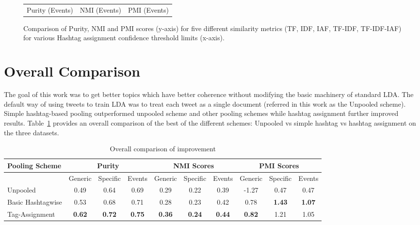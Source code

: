 \documentclass[10pt,a5paper,twoside]{article}
\begin{document}
\begin{figure}[t!]
\begin{center}
{\begin{tabular}{ccc}
		

		{\LARGE Purity (Events)} & {\LARGE NMI (Events)} & 
		{\LARGE PMI (Events)}\\

	
	\end{tabular}
}
\end{center}
\vspace{-4mm}
\caption{\footnotesize Comparison of Purity, NMI and PMI scores
  (y-axis) for five different similarity metrics (TF, IDF, IAF,
  TF-IDF, TF-IDF-IAF) for various Hashtag assignment confidence
  threshold limits (x-axis).} \label{fig-1}
\end{figure}

\section{Overall Comparison}

\label{sec:overall}

The goal of this work was to get better topics which have better
coherence without modifying the basic machinery of standard LDA. The
default way of using tweets to train LDA was to treat each tweet as a
single document (referred in this work as the Unpooled scheme). Simple
hashtag-based pooling outperformed unpooled scheme and other pooling
schemes while hashtag assignment further improved
results. Table~\ref{tbl-10} provides an overall comparison of the best
of the different schemes: Unpooled vs simple hashtag vs hashtag
assignment on the three datasets.

\begin{table}[!h]
\centering
\resizebox{14cm}{!} 
{
	\begin{tabular}{|l|ccc|ccc|ccc|}
	\hline
	Pooling Scheme  & \multicolumn {3}{c}{Purity} & \multicolumn {3}{c}{NMI Scores} & \multicolumn {3}{c|}{PMI Scores}\\
	\hline
	 & Generic & Specific & Events &  Generic & Specific & Events &  Generic & Specific & Events\\
	\hline
	Unpooled & 0.49 & 0.64 & 0.69 & 0.29 & 0.22 & 0.39 & -1.27 & 0.47 & 0.47 \\
	\hline
	Basic Hashtagwise & 0.53 & 0.68 & 0.71 & 0.28 & 0.23 & 0.42 & 0.78 & \textbf{1.43} & \textbf{1.07} \\
	\hline
	Tag-Assignment & \textbf{0.62} & \textbf{0.72} & \textbf{0.75} & \textbf{0.36} & \textbf{0.24} & \textbf{0.44} & \textbf{0.82} & 1.21 & 1.05 \\
	\hline
	\end{tabular}
}
\caption{Overall comparison of improvement}\label{tbl-10}
\end{table}
\end{document}
